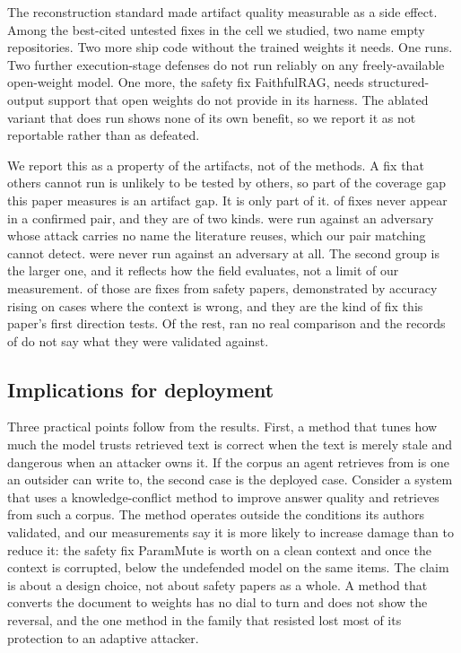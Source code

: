 The reconstruction standard made artifact quality measurable as a side effect.
Among the best-cited untested fixes in the cell we studied, two name
empty repositories. Two more ship code without the trained weights it needs.
One runs. Two further execution-stage defenses do not
run reliably on any freely-available open-weight model. One more,
the safety fix FaithfulRAG, needs structured-output support
that open weights do not provide in its harness. The ablated variant that
does run shows none of its own benefit, so we report it as not reportable
rather than as defeated.

We report this as a property of the artifacts, not of the methods. A fix
that others cannot run is unlikely to be tested by others, so part of the
coverage gap this paper measures is an artifact gap. It is only part of it.
\NFixUnpaired{} of \NFixes{} fixes never appear in a
confirmed pair, and they are of two kinds. \NFixUnpairedAttacked{} were run
against an adversary whose attack carries no name the literature reuses, which our pair matching cannot detect. \NDefEvalNoAdversary{} were never run against an adversary
at all. The second group is the larger one, and it
reflects how the field evaluates, not a limit of our measurement. \NDefNoAdvSafety{} of those \NDefEvalNoAdversary{} are
fixes from safety papers, demonstrated by accuracy rising on cases where the
context is wrong, and they are the kind of fix this paper's first
direction tests.
Of the rest, \NDefEvalNoBaseline{} ran no real comparison and the records of
\NDefEvalUnclear{} do not say what they were validated against.

\subsection{Implications for deployment}

Three practical points follow from the results. First, a method that tunes how much the model trusts retrieved text is correct
when the text is merely stale and dangerous when an attacker owns it. If the
corpus an agent retrieves from is one an outsider can write to, the second
case is the deployed case. Consider a system that uses a knowledge-conflict method to improve answer
quality and retrieves from such a corpus. The method operates outside the
conditions its authors validated, and our measurements say it is more likely to
increase damage than to reduce it: the safety fix ParamMute is
worth \NDefCellClean{} on a clean context and \NDefCellSat{} once the
context is corrupted, below the undefended model on the same items. The
claim is about a design choice, not about safety papers as a whole. A method that
converts the document to weights has no dial to turn and does not show the
reversal, and the one method in the family that resisted lost most of its
protection to an adaptive attacker.

